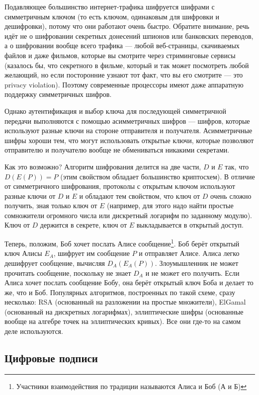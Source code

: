 \documentclass{../../text-style}
\begin{document}
Подавляющее большинство интернет-трафика шифруется шифрами с симметричным ключом (то есть ключом, одинаковым для шифровки и дешифровки), потому что они работают очень быстро. Обратите внимание, речь идёт не о шифровании секретных донесений шпионов или банковских переводов, а о шифровании вообще всего трафика --- любой веб-страницы, скачиваемых файлов и даже фильмов, которые вы смотрите через стриминговые сервисы (казалось бы, что секретного в фильме, который и так может посмотреть любой желающий, но если посторонние узнают тот факт, что вы его смотрите --- это privacy violation). Поэтому современные процессоры имеют даже аппаратную поддержку симметричных шифров. 

Однако аутентификация и выбор ключа для последующей симметричной передачи выполняются с помощью асимметричных шифров --- шифров, которые используют разные ключи на стороне отправителя и получателя. Асимметричные шифры хороши тем, что могут использовать открытые ключи, которые позволяют отправителю и получателю вообще не обмениваться никакими секретами. 

Как это возможно? Алгоритм шифрования делится на две части, $D$ и $E$ так, что $D(E(P)) = P$ (этим свойством обладает большинство криптосхем). В отличие от симметричного шифрования, протоколы с открытым ключом используют разные ключи от $D$ и $E$ и обладают тем свойством, что ключ от $D$ очень сложно получить, зная только ключ от $E$ (например, для этого надо найти простые сомножители огромного числа или дискретный логарифм по заданному модулю). Ключ от $D$ держится в секрете, ключ от $E$ выкладывается в открытый доступ.

Теперь, положим, Боб хочет послать Алисе сообщение\footnote{Участники взаимодействия по традиции называются Алиса и Боб (А и Б)}. Боб берёт открытый ключ Алисы $E_A$, шифрует им сообщение $P$ и отправляет Алисе. Алиса легко дешифрует сообщение, вычисляя $D_A(E_A(P))$. Злоумышленник не может прочитать сообщение, поскольку не знает $D_A$ и не может его получить. Если Алиса хочет послать сообщение Бобу, она берёт открытый ключ Боба и делает то же, что и Боб. Популярных алгоритмов, построенных по такой схеме, сразу несколько: RSA (основанный на разложении на простые множители), ElGamal (основанный на дискретных логарифмах), эллиптические шифры (основанные вообще на алгебре точек на эллиптических кривых). Все они где-то на самом деле используются.

\subsection{Цифровые подписи}
\end{document}

